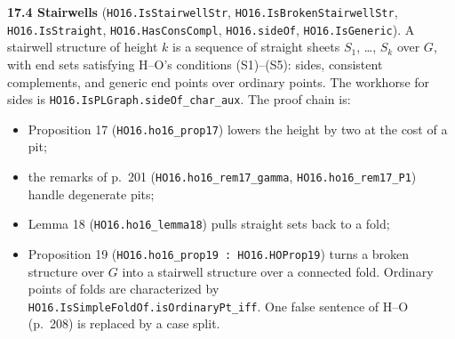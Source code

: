 \documentclass[11pt]{article}
\newcommand{\lean}[1]{\texttt{#1}}
\begin{document}
\textbf{17.4 Stairwells} (\lean{HO16.\hspace{0pt}IsStairwellStr}, \lean{HO16.\hspace{0pt}IsBrokenStairwellStr}, \lean{HO16.\hspace{0pt}IsStraight}, \lean{HO16.\hspace{0pt}HasConsCompl}, \lean{HO16.\hspace{0pt}sideOf}, \lean{HO16.\hspace{0pt}IsGeneric}). A stairwell structure of height $k$ is a sequence of straight sheets $S_1$, \dots{}, $S_k$ over $G$, with end sets satisfying H--O's conditions (S1)--(S5): sides, consistent complements, and generic end points over ordinary points. The workhorse for sides is \lean{HO16.\hspace{0pt}IsPLGraph.\hspace{0pt}sideOf\_\hspace{0pt}char\_\hspace{0pt}aux}. The proof chain is:

\begin{itemize}
  \item Proposition 17 (\lean{HO16.\hspace{0pt}ho16\_\hspace{0pt}prop17}) lowers the height by two at the cost of a pit;
  \item the remarks of p.~201 (\lean{HO16.\hspace{0pt}ho16\_\hspace{0pt}rem17\_\hspace{0pt}gamma}, \lean{HO16.\hspace{0pt}ho16\_\hspace{0pt}rem17\_\hspace{0pt}P1}) handle degenerate pits;
  \item Lemma 18 (\lean{HO16.\hspace{0pt}ho16\_\hspace{0pt}lemma18}) pulls straight sets back to a fold;
  \item Proposition 19 (\lean{HO16.\hspace{0pt}ho16\_\hspace{0pt}prop19 : HO16.\hspace{0pt}HOProp19}) turns a broken structure over $G$ into a stairwell structure over a connected fold. Ordinary points of folds are characterized by \lean{HO16.\hspace{0pt}IsSimpleFoldOf.\hspace{0pt}isOrdinaryPt\_\hspace{0pt}iff}. One false sentence of H--O (p.~208) is replaced by a case split.
\end{itemize}
\end{document}

